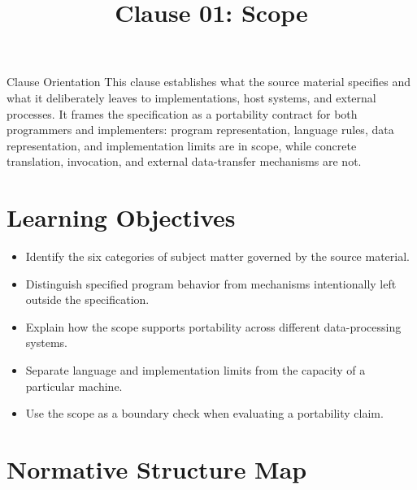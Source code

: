 \documentclass[10pt,letterpaper]{article}
\title{Clause 01: Scope}
\author{}
\date{}
\begin{document}
\maketitle



\begin{CornellOverviewBox}{Clause Orientation}
This clause establishes what the source material specifies and what it deliberately leaves to implementations, host systems, and external processes. It frames the specification as a portability contract for both programmers and implementers: program representation, language rules, data representation, and implementation limits are in scope, while concrete translation, invocation, and external data-transfer mechanisms are not.
\end{CornellOverviewBox}

\section{Learning Objectives}
\begin{itemize}
  \item Identify the six categories of subject matter governed by the source material.
  \item Distinguish specified program behavior from mechanisms intentionally left outside the specification.
  \item Explain how the scope supports portability across different data-processing systems.
  \item Separate language and implementation limits from the capacity of a particular machine.
  \item Use the scope as a boundary check when evaluating a portability claim.
\end{itemize}

\section{Normative Structure Map}
\begin{CornellNotesTable}
\end{CornellNotesTable}
\end{document}
